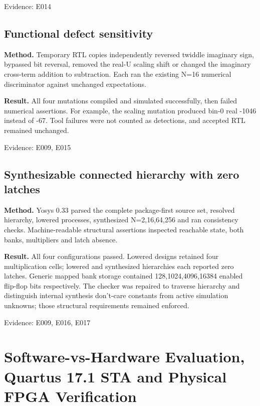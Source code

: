 \documentclass[11pt,a4paper]{article}
\begin{document}
{\small Evidence: E014}

\subsection{Functional defect sensitivity}

\textbf{Method.} Temporary RTL copies independently reversed twiddle imaginary sign,\allowbreak{} bypassed bit reversal,\allowbreak{} removed the real-U scaling shift or changed the imaginary cross-term addition to subtraction. Each ran the existing N=\allowbreak{}16 numerical discriminator against unchanged expectations.

\textbf{Result.} All four mutations compiled and simulated successfully,\allowbreak{} then failed numerical assertions. For example,\allowbreak{} the scaling mutation produced bin-0 real -1046 instead of -67. Tool failures were not counted as detections,\allowbreak{} and accepted RTL remained unchanged.

{\small Evidence: E009,\allowbreak{} E015}

\subsection{Synthesizable connected hierarchy with zero latches}

\textbf{Method.} Yosys 0.33 parsed the complete package-first source set,\allowbreak{} resolved hierarchy,\allowbreak{} lowered processes,\allowbreak{} synthesized N=\allowbreak{}2,\allowbreak{}16,\allowbreak{}64,\allowbreak{}256 and ran consistency checks. Machine-readable structural assertions inspected reachable state,\allowbreak{} both banks,\allowbreak{} multipliers and latch absence.

\textbf{Result.} All four configurations passed. Lowered designs retained four multiplication cells; lowered and synthesized hierarchies each reported zero latches. Generic mapped bank storage contained 128,\allowbreak{}1024,\allowbreak{}4096,\allowbreak{}16384 enabled flip-flop bits respectively. The checker was repaired to traverse hierarchy and distinguish internal synthesis don't-care constants from active simulation unknowns; those structural requirements remained enforced.

{\small Evidence: E009,\allowbreak{} E016,\allowbreak{} E017}

\section{Software-vs-Hardware Evaluation, Quartus 17.1 STA and Physical FPGA Verification}
\end{document}
